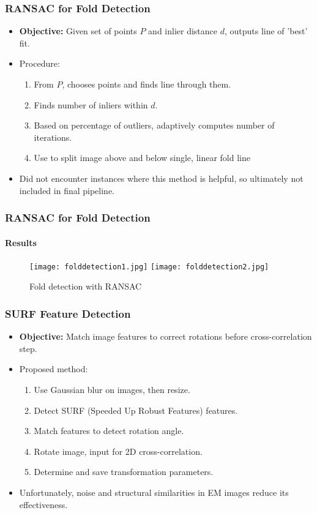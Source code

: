 \documentclass{beamer}
\begin{document}
\begin{frame}
\frametitle{RANSAC for Fold Detection}
\begin{itemize}
\item \textbf{Objective:} Given set of points $P$ and inlier distance $d$, outputs line of 'best' fit.
\item Procedure: 
\begin{enumerate}
\item From $P$, chooses points and finds line through them. 
\item Finds number of inliers within $d$. 
\item Based on percentage of outliers, adaptively computes number of iterations.
\item Use to split image above and below single, linear fold line
\end{enumerate}
\item Did not encounter instances where this method is helpful, so ultimately not included in final pipeline.
\end{itemize}
\end{frame}

\begin{frame}
\frametitle{RANSAC for Fold Detection}
\framesubtitle{Results}
\begin{figure}[p]
    \centering
    \texttt{[image: folddetection1.jpg]}
    \texttt{[image: folddetection2.jpg]}
    \caption{Fold detection with RANSAC}
\end{figure}
\end{frame}

\begin{frame}
\frametitle{SURF Feature Detection}
\begin{itemize}
\item \textbf{Objective:} Match image features to correct rotations before cross-correlation step. 
\item Proposed method:
\begin{enumerate}
\item Use Gaussian blur on images, then resize.
\item Detect SURF (Speeded Up Robust Features) features. 
\item Match features to detect rotation angle. 
\item Rotate image, input for 2D cross-correlation.
\item Determine and save transformation parameters.
\end{enumerate}
\item Unfortunately, noise and structural similarities in EM images reduce its effectiveness.
\end{itemize}
\end{frame}
\end{document}
